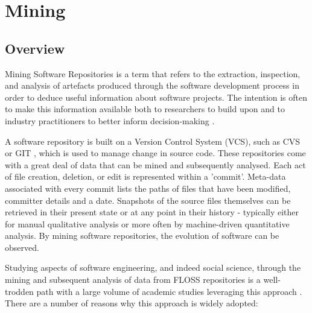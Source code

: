 \section{Mining} %
\subsection{Overview}
Mining Software Repositories is a term that refers to the extraction, inspection, and analysis of artefacts produced through the software development process in order to deduce useful information about software projects. The intention is often to make this information available both to researchers to build upon and to industry practitioners to better inform decision-making \citep{hassan2008road}.

A software repository is built on a Version Control System (VCS), such as CVS \citep{cvs} or GIT \citep{git}, which is used to manage change in source code. These repositories come with a great deal of data that can be mined and subsequently analysed. Each act of file creation, deletion, or edit is represented within a 'commit'. Meta-data associated with every commit lists the paths of files that have been modified, committer details and a date. Snapshots of the source files themselves can be retrieved in their present state or at any point in their history - typically either for manual qualitative analysis or more often by machine-driven quantitative analysis. By mining software repositories, the evolution of software can be observed. 

Studying aspects of software engineering, and indeed social science, through the mining and subsequent analysis of data from FLOSS repositories is a well-trodden path with a large volume of academic studies leveraging this approach \citep{hassan2008road, hemmati2013msr}. There are a number of reasons why this approach is widely adopted:

